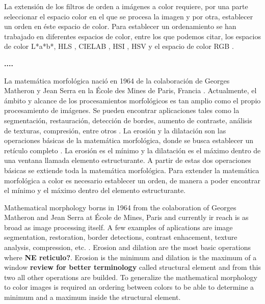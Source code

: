 La extensi\'on de los filtros de orden a im\'agenes a color requiere, por una parte seleccionar el espacio color en el que se procesa la imagen y por otra, establecer un orden en \'este espacio de color. Para establecer un ordenamiento se han trabajado en diferentes espacios de color, entre los que podemos citar, los espacios de color L*a*b*\cite{hanbury2001mathematical}, HLS \cite{hanbury2001mathematical2},  CIELAB \cite{hanbury2002mathematical3}, HSI \cite{tobar2007mathematical}, HSV \cite{lei2013vector} y el espacio de color RGB  \cite{zaharescu2003color, gao2013adaptive, wang2012edge}.

\textbf{....}

La matemática morfológica nació en 1964 de la colaboración de Georges Matheron y Jean Serra en la École des Mines de Paris, Francia \cite{serra1982image}. Actualmente, el ámbito y alcance de los procesamientos morfológicos es tan amplio como el propio procesamiento de imágenes. Se pueden encontrar aplicaciones tales como la segmentación, restauración, detección de bordes, aumento de contraste, análisis de texturas, compresión, entre otros \cite{ortiz2002procesamiento}. 
La erosi\'on y la dilataci\'on son las operaciones b\'asicas de la matem\'atica morfol\'ogica, donde se busca establecer un ret\'iculo completo \cite{heijmans1990algebraic}. La erosi\'on es el m\'inimo y la dilataci\'on es el m\'aximo dentro de una ventana llamada elemento estructurante. A partir de estas dos operaciones b\'asicas se extiende toda la matem\'atica morfol\'ogica.  Para extender la matem\'atica morfol\'ogica a color es necesario establecer un orden, de manera a poder encontrar el m\'inimo y el m\'aximo dentro del elemento estructurante.

Mathematical morphology borns in 1964 from the colaboration of Georges Matheron and Jean Serra at École de Mines, Paris \cite{serra1982image} and currently ir reach is as broad as image processing itself. A few examples of aplications are image segmentation, restoration, border detections, contrast enhacement, texture analysis, compression, etc. \cite{ortiz2002procesamiento}.
Erosion and dilation are the most basic operations where \textbf{NE reticulo?}\cite{heijmans1990algebraic}. Erosion is the minimum and dilation is the maximum of a window \textbf{review for better terminology} called structural element and from this two all other operations are builded. To generalize the mathematical morphology to color images is required an ordering between colors to be able to determine a minimum and a maximum inside the structural element.

